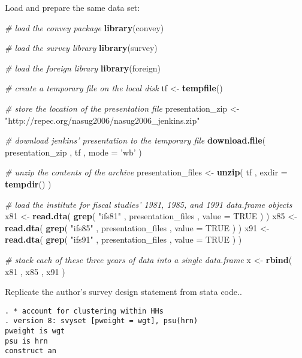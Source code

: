 \documentclass[]{book}
\newenvironment{Shaded}{\begin{snugshade}}{\end{snugshade}}
\newcommand{\CommentTok}[1]{\textcolor[rgb]{0.56,0.35,0.01}{\textit{#1}}}
\newcommand{\DataTypeTok}[1]{\textcolor[rgb]{0.13,0.29,0.53}{#1}}
\newcommand{\KeywordTok}[1]{\textcolor[rgb]{0.13,0.29,0.53}{\textbf{#1}}}
\newcommand{\NormalTok}[1]{#1}
\newcommand{\OtherTok}[1]{\textcolor[rgb]{0.56,0.35,0.01}{#1}}
\newcommand{\StringTok}[1]{\textcolor[rgb]{0.31,0.60,0.02}{#1}}
\begin{document}
Load and prepare the same data set:

\begin{Shaded}
\begin{Highlighting}[]
\CommentTok{# load the convey package}
\KeywordTok{library}\NormalTok{(convey)}

\CommentTok{# load the survey library}
\KeywordTok{library}\NormalTok{(survey)}

\CommentTok{# load the foreign library}
\KeywordTok{library}\NormalTok{(foreign)}

\CommentTok{# create a temporary file on the local disk}
\NormalTok{tf <-}\StringTok{ }\KeywordTok{tempfile}\NormalTok{()}

\CommentTok{# store the location of the presentation file}
\NormalTok{presentation_zip <-}\StringTok{ "http://repec.org/nasug2006/nasug2006_jenkins.zip"}

\CommentTok{# download jenkins' presentation to the temporary file}
\KeywordTok{download.file}\NormalTok{( presentation_zip , tf , }\DataTypeTok{mode =} \StringTok{'wb'}\NormalTok{ )}

\CommentTok{# unzip the contents of the archive}
\NormalTok{presentation_files <-}\StringTok{ }\KeywordTok{unzip}\NormalTok{( tf , }\DataTypeTok{exdir =} \KeywordTok{tempdir}\NormalTok{() )}

\CommentTok{# load the institute for fiscal studies' 1981, 1985, and 1991 data.frame objects}
\NormalTok{x81 <-}\StringTok{ }\KeywordTok{read.dta}\NormalTok{( }\KeywordTok{grep}\NormalTok{( }\StringTok{"ifs81"}\NormalTok{ , presentation_files , }\DataTypeTok{value =} \OtherTok{TRUE}\NormalTok{ ) )}
\NormalTok{x85 <-}\StringTok{ }\KeywordTok{read.dta}\NormalTok{( }\KeywordTok{grep}\NormalTok{( }\StringTok{"ifs85"}\NormalTok{ , presentation_files , }\DataTypeTok{value =} \OtherTok{TRUE}\NormalTok{ ) )}
\NormalTok{x91 <-}\StringTok{ }\KeywordTok{read.dta}\NormalTok{( }\KeywordTok{grep}\NormalTok{( }\StringTok{"ifs91"}\NormalTok{ , presentation_files , }\DataTypeTok{value =} \OtherTok{TRUE}\NormalTok{ ) )}

\CommentTok{# stack each of these three years of data into a single data.frame}
\NormalTok{x <-}\StringTok{ }\KeywordTok{rbind}\NormalTok{( x81 , x85 , x91 )}
\end{Highlighting}
\end{Shaded}

Replicate the author's survey design statement from stata code..

\begin{verbatim}
. * account for clustering within HHs 
. version 8: svyset [pweight = wgt], psu(hrn)
pweight is wgt
psu is hrn
construct an
\end{verbatim}
\end{document}
